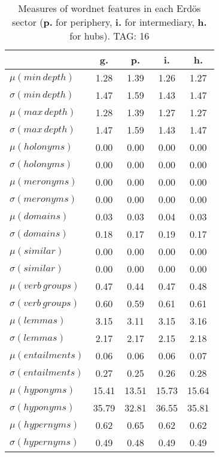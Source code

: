 \begin{table}[h!]
\begin{center}
\begin{tabular}{| l || c | c | c | c |}\hline
 & {\bf g.} & {\bf p.} & {\bf i.} & {\bf h.} \\\hline\hline
$\mu(min\,depth)$ & 1.28  & 1.39  & 1.26  & 1.27 \\
$\sigma(min\,depth)$ & 1.47  & 1.59  & 1.43  & 1.47 \\\hline
$\mu(max\,depth)$ & 1.28  & 1.39  & 1.27  & 1.27 \\
$\sigma(max\,depth)$ & 1.47  & 1.59  & 1.43  & 1.47 \\\hline
$\mu(holonyms)$ & 0.00  & 0.00  & 0.00  & 0.00 \\
$\sigma(holonyms)$ & 0.00  & 0.00  & 0.00  & 0.00 \\\hline
$\mu(meronyms)$ & 0.00  & 0.00  & 0.00  & 0.00 \\
$\sigma(meronyms)$ & 0.00  & 0.00  & 0.00  & 0.00 \\\hline
$\mu(domains)$ & 0.03  & 0.03  & 0.04  & 0.03 \\
$\sigma(domains)$ & 0.18  & 0.17  & 0.19  & 0.17 \\\hline
$\mu(similar)$ & 0.00  & 0.00  & 0.00  & 0.00 \\
$\sigma(similar)$ & 0.00  & 0.00  & 0.00  & 0.00 \\\hline
$\mu(verb\,groups)$ & 0.47  & 0.44  & 0.47  & 0.48 \\
$\sigma(verb\,groups)$ & 0.60  & 0.59  & 0.61  & 0.61 \\\hline
$\mu(lemmas)$ & 3.15  & 3.11  & 3.15  & 3.16 \\
$\sigma(lemmas)$ & 2.17  & 2.17  & 2.15  & 2.18 \\\hline
$\mu(entailments)$ & 0.06  & 0.06  & 0.06  & 0.07 \\
$\sigma(entailments)$ & 0.27  & 0.25  & 0.26  & 0.28 \\\hline
$\mu(hyponyms)$ & 15.41  & 13.51  & 15.73  & 15.64 \\
$\sigma(hyponyms)$ & 35.79  & 32.81  & 36.55  & 35.81 \\\hline
$\mu(hypernyms)$ & 0.62  & 0.65  & 0.62  & 0.62 \\
$\sigma(hypernyms)$ & 0.49  & 0.48  & 0.49  & 0.49 \\\hline
\end{tabular}
\caption{Measures of wordnet features in each Erd\"os sector ({{\bf p.}} for periphery, {{\bf i.}} for intermediary, {{\bf h.}} for hubs). TAG: 16}
\end{center}
\end{table}